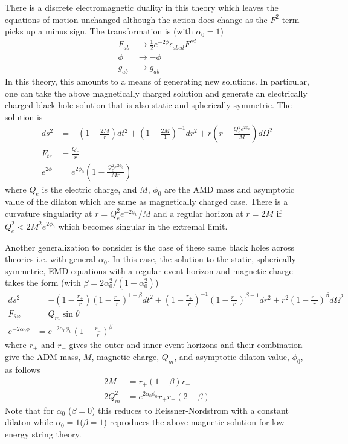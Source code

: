 \documentclass[prd]{revtex4}
\begin{document}
There is a discrete electromagnetic duality in this theory which leaves the equations of motion unchanged although the action does change as the $F^2$ term picks up a minus sign. The transformation is (with $\alpha_0 = 1$)
\begin{align}
F_{ab} &\rightarrow \frac{1}{2} e^{-2\phi} \epsilon_{abcd} F^{cd} \\
\phi &\rightarrow -\phi \\
g_{ab} &\rightarrow g_{ab}
\end{align}
In this theory, this amounts to a means of generating new solutions. In particular, one can take the above magnetically charged solution and generate an electrically charged black hole solution that is also static and spherically symmetric. The solution is
\begin{align}
ds^2 &= - \left(1 - \frac{2M}{r} \right) dt^2 + \left(1-\frac{2M}{1}\right)^{-1} dr^2 + r \left(r-\frac{Q_e^2 e^{2 \phi_0}}{M} \right) d\Omega^2 \\
F_{tr} &= \frac{Q_e}{r} \\
e^{2\phi} &= e^{2\phi_0} \left(1-\frac{Q_e^2 e^{2\phi_0}}{Mr} \right)
\end{align}
where $Q_e$ is the electric charge, and $M$, $\phi_0$ are the AMD mass and asymptotic value of the dilaton which are same as magnetically charged case. There is a curvature singularity at $r=Q^2_e e^{-2 \phi_0} /M$ and a regular horizon at $r=2M$ if $Q^2_e < 2 M^2 e^{2\phi_0}$ which becomes singular in the extremal limit.

Another generalization to consider is the case of these same black holes across theories i.e. with general $\alpha_0$. In this case, the solution to the static, spherically symmetric, EMD equations with a regular event horizon and magnetic charge takes the form (with $\beta = 2 \alpha_0^2 /(1+ \alpha_0^2)$) 
\begin{align}
ds^2 &= -\left(1-\frac{r_+}{r} \right) \left(1-\frac{r_-}{r} \right)^{1-\beta} dt^2 + \left(1-\frac{r_+}{r} \right)^{-1} \left(1-\frac{r_-}{r} \right)^{\beta-1} dr^2 + r^2 \left(1-\frac{r_-}{r}\right)^\beta d \Omega^2 \\
F_{\theta \varphi} &= Q_m \sin \theta \\
e^{- 2 \alpha_0 \phi} &= e^{-2 \alpha_0 \phi_0} \left(1-\frac{r_-}{r} \right)^\beta
\end{align}
where $r_+$ and $r_-$ gives the outer and inner event horizons and their combination give the ADM mass, $M$, magnetic charge, $Q_m$, and asymptotic dilaton value, $\phi_0$, as follows
\begin{align}
2M &= r_+ (1-\beta)r_- \\
2Q_m^2 &= e^{2\alpha_0 \phi_0} r_+ r_- (2-\beta)
\end{align}
Note that for $\alpha_0$ ($\beta=0$) this reduces to Reissner-Nordstrom with a constant dilaton whilc $\alpha_0=1$($\beta=1$) reproduces the above magnetic solution for low energy string theory.
\end{document}
